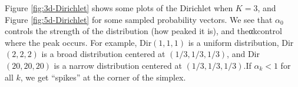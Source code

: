 \documentclass[graybox, envcountchap, twocolumn]{styles/svmult}
\begin{document}
Figure \ref{fig:3d-Dirichlet} shows some plots of the Dirichlet when $K=3$, and Figure \ref{fig:5d-Dirichlet} for some sampled probability vectors. We see that $\alpha_0$ controls the strength of the distribution (how peaked it is), and theαkcontrol where the peak occurs. For example, Dir$(1,1,1)$ is a uniform distribution, Dir$(2,2,2)$ is a broad distribution centered at $(1/3,1/3,1/3)$, and Dir$(20,20,20)$ is a narrow distribution centered at $(1/3,1/3,1/3)$.If $\alpha_k < 1$ for all $k$, we get “spikes” at the corner of the simplex.

\begin{figure}[hbtp]
\centering
{} \\
 \\
 \\

\end{figure}
\end{document}
